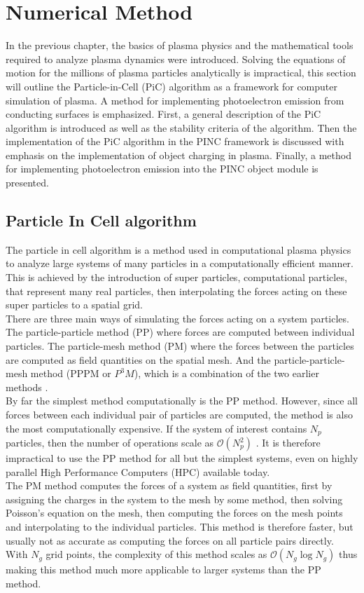 \chapter{Numerical Method}
\label{sec:methods}
In the previous chapter, the basics of plasma physics and the mathematical tools required to analyze plasma dynamics were introduced. Solving the equations of motion for the millions of plasma particles analytically is impractical, this section will outline the Particle-in-Cell (PiC) algorithm as a framework for computer simulation of plasma. A method for implementing photoelectron emission from conducting surfaces is emphasized. First, a general description of the PiC algorithm is introduced as well as the stability criteria of the algorithm. Then the implementation of the PiC algorithm in the PINC framework is discussed with emphasis on the implementation of object charging in plasma. Finally, a method for implementing photoelectron emission into the PINC object module is presented.

\section{Particle In Cell algorithm}
The particle in cell algorithm is a method used in computational plasma physics to analyze large systems of many particles in a computationally efficient manner. This is achieved by the introduction of super particles, computational particles, that represent many real particles, then interpolating the forces acting on these super particles to a spatial grid.\\
There are three main ways of simulating the forces acting on a system particles. The particle-particle method (PP) where forces are computed between individual particles. The particle-mesh method (PM) where the forces between the particles are computed as field quantities on the spatial mesh. And the particle-particle-mesh method (PPPM or $P^3M$), which is a combination of the two earlier methods \parencite{Birdsall2004}.\\
By far the simplest method computationally is the PP method. However, since all forces between each individual pair of particles are computed, the method is also the most computationally expensive. If the system of interest contains $N_p$ particles, then the number of operations scale as $\mathcal{O}(N^2_p)$ \parencite[p.20]{Hockney1988}. It is therefore impractical to use the PP method for all but the simplest systems, even on highly parallel High Performance Computers (HPC) available today.\\
The PM method computes the forces of a system as field quantities, first by assigning the charges in the system to the mesh by some method, then solving Poisson's equation on the mesh, then computing the forces on the mesh points and interpolating to the individual particles. This method is therefore faster, but usually not as accurate as computing the forces on all particle pairs directly. With $N_g$ grid points, the complexity of this method scales as $\mathcal{O}(N_g \log{N_g})$ \parencite{Hockney1988} thus making this method much more applicable to larger systems than the PP method.

